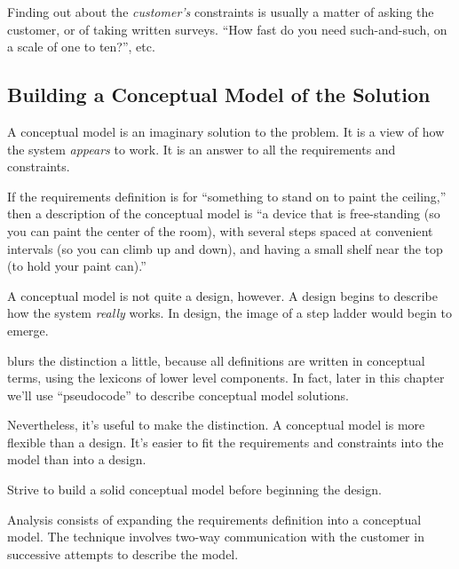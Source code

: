 Finding out about the \emph{customer's} constraints
is usually a matter of asking the customer, or of taking written
surveys. ``How fast do you need such-and-such, on a scale of one to
ten?'', etc.

\subsection{Building a Conceptual Model of the Solution}

A conceptual model is an imaginary solution to the problem. It is a
view of how the system \emph{appears} to work. It is an answer to all
the requirements and constraints.


If the requirements definition is for ``something to stand on to paint
the ceiling,'' then a description of the conceptual model is ``a
device that is free-standing (so you can paint the center of the
room), with several steps spaced at convenient intervals (so you can
climb up and down), and having a small shelf near the top (to hold
your paint can).''

A conceptual model is not quite a design, however. A design begins to
describe how the system \emph{really} works. In design, the image of a
step ladder would begin to emerge.

\Forth{} blurs the distinction a little, because all definitions are
written in conceptual terms, using the lexicons of lower level
components. In fact, later in this chapter we'll use \Forth{}
``pseudocode'' to describe conceptual model solutions.

Nevertheless, it's useful to make the distinction. A conceptual model
is more flexible than a design. It's easier to fit the requirements
and constraints into the model than into a design.

\begin{tip}
Strive to build a solid conceptual model before beginning the design.
\end{tip}


\noindent Analysis consists of expanding the requirements definition
into a conceptual model. The technique involves two-way communication
with the customer in successive attempts to describe the model.

